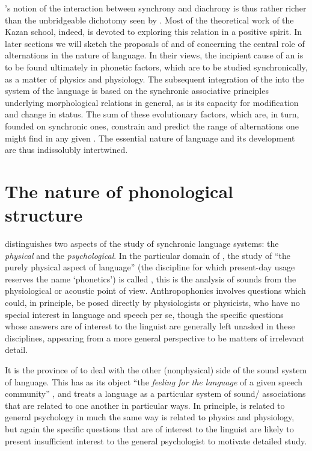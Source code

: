 {\Baudouin}'s notion of the interaction between synchrony and diachrony
is thus rather richer than the unbridgeable dichotomy seen by
{\Saussure}. Most of the theoretical work of the Kazan school, indeed, is
devoted to exploring this relation in a positive spirit. In later
sections we will sketch the proposals of {\Kruszewski} and of {\Baudouin}
concerning the central role of alternations in the nature of
language. In their views, the incipient cause of an  is to
be found ultimately in phonetic factors, which are to be studied
synchronically, as a matter of physics and physiology. The subsequent
integration of the  into the system of the language is
based on the synchronic associative principles underlying
morphological relations in general, as is its capacity for
modification and change in status. The sum of these evolutionary
factors, which are, in turn, founded on synchronic ones, constrain and
predict the range of alternations one might find in any given
. The essential nature of language and its
development are thus indissolubly intertwined.

\section{The nature of phonological structure}
\label{sec:nature-phon-struct}

{\Baudouin} distinguishes two aspects of the study of synchronic language
systems: the \emph{physical} and the \emph{psychological}. In the particular domain
of , the study of ``the purely physical aspect of
language'' (the discipline for which present-day usage reserves the
name `phonetics') is called \emph{}, this is the analysis of
sounds from the physiological or acoustic point of
view. Anthropophonics involves questions which could, in principle, be
posed directly by physiologists or physicists, who have no special
interest in language and speech per se, though the specific questions
whose answers are of interest to the linguist are generally left
unasked in these disciplines, appearing from a more general
perspective to be matters of irrelevant detail.

It is the province of \emph{} to deal with the other
(nonphysical) side of the sound system of language. This has as its
object ``the \emph{feeling for the language} of a given speech
community'' \citep[58; emphasis in the
original]{baudouin71:general-remarks}, and treats a language as a
particular system of sound/ associations that are related to
one another in particular ways. In principle,  is
related to general psychology in much the same way  is
related to physics and physiology, but again the specific questions
that are of interest to the linguist are likely to present
insufficient interest to the general psychologist to motivate detailed
study.

